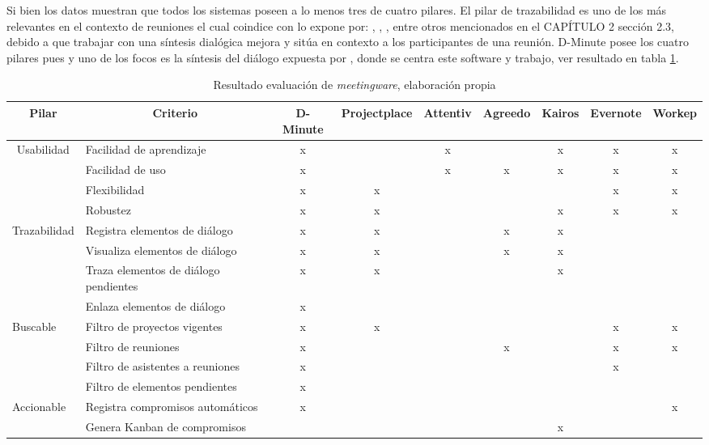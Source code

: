Si bien los datos muestran que todos los sistemas poseen a lo menos tres de cuatro pilares. El pilar de trazabilidad es uno de los más relevantes en el contexto de reuniones el cual coindice con lo expone por: , , ,  entre otros mencionados en el CAPÍTULO 2 sección 2.3, debido a que trabajar con una síntesis dialógica mejora y sitúa en contexto a los participantes de una reunión. D-Minute posee los cuatro pilares pues y uno de los focos es la síntesis del diálogo expuesta por , donde se centra este software y trabajo, ver resultado en tabla \ref{tab:resultadoevaluacion}.

\begin{table}[!h]
\centering
\caption{Resultado evaluación de \textit{meetingware}, elaboración propia}
\label{tab:resultadoevaluacion}
\resizebox{15cm}{!} {
\begin{tabular}{|l|l|c|c|c|c|c|c|c|}
\hline
\multicolumn{1}{|c|}{Pilar} & \multicolumn{1}{c|}{Criterio} & D-Minute & Projectplace & Attentiv & Agreedo & Kairos & Evernote & Workep \\ \hline
\multicolumn{1}{|c|}{\multirow{4}{*}{Usabilidad}} & Facilidad de aprendizaje & x &  & x &  & x & x & x \\ \cline{2-9} 
\multicolumn{1}{|c|}{} & Facilidad de uso & x &  & x & x & x & x & x \\ \cline{2-9} 
\multicolumn{1}{|c|}{} & Flexibilidad & x & x &  &  &  & x & x \\ \cline{2-9} 
\multicolumn{1}{|c|}{} & Robustez & x & x &  &  & x & x & x \\ \hline
\multirow{4}{*}{Trazabilidad} & Registra elementos de diálogo & x & x &  & x & x &  &  \\ \cline{2-9} 
 & Visualiza elementos de diálogo & x & x &  & x & x &  &  \\ \cline{2-9} 
 & Traza elementos de diálogo pendientes & x & x &  &  & x &  &  \\ \cline{2-9} 
 & Enlaza elementos de diálogo & x &  &  &  &  &  &  \\ \hline
\multirow{4}{*}{Buscable} & Filtro de proyectos vigentes & x & x &  &  &  & x & x \\ \cline{2-9} 
 & Filtro de reuniones & x &  &  & x &  & x & x \\ \cline{2-9} 
 & Filtro de asistentes a reuniones & x &  &  &  &  & x &  \\ \cline{2-9} 
 & Filtro de elementos pendientes & x &  &  &  &  &  &  \\ \hline
\multirow{2}{*}{Accionable} & Registra compromisos automáticos & x &  &  &  &  &  & x \\ \cline{2-9} 
 & Genera Kanban de compromisos &  &  &  &  & x &  &  \\ \hline
\end{tabular}
}
\end{table}

